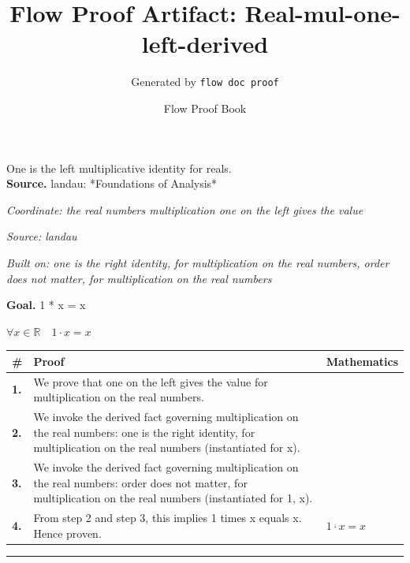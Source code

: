 \documentclass[11pt]{article}
\title{Flow Proof Artifact: Real-mul-one-left-derived}
\author{Generated by \texttt{flow doc proof}}
\date{Flow Proof Book}
\theoremstyle{definition}
\begin{document}
\maketitle
One is the left multiplicative identity for reals.\\[0.5em]
\textbf{Source.} landau: *Foundations of Analysis*\\[0.5em]
\bigskip
{}\par
\smallskip\noindent\textit{Coordinate: the real numbers \cdot multiplication \cdot one on the left gives the value}\par
\smallskip\noindent\textit{Source: landau}\par
\smallskip\noindent\textit{Built on: one is the right identity, for multiplication on the real numbers, order does not matter, for multiplication on the real numbers}\par
\medskip
\noindent\textbf{Goal.} 1 * x = x\par
\noindent$\displaystyle \forall x \in \mathbb{R}\quad 1 \cdot x = x$\par
\medskip
\noindent
\begin{tabular}{@{} >{\raggedright\arraybackslash}p{} >{\raggedright\arraybackslash}p{} >{\raggedleft\arraybackslash}p{} @{}}
\textbf{\#} & \textbf{Proof} & \textbf{Mathematics} \\
\midrule
\textbf{1.} & We prove that one on the left gives the value for multiplication on the real numbers. & \\[0.45em]
\textbf{2.} & We invoke the derived fact governing multiplication on the real numbers: one is the right identity, for multiplication on the real numbers (instantiated for x). & \\[0.45em]
\textbf{3.} & We invoke the derived fact governing multiplication on the real numbers: order does not matter, for multiplication on the real numbers (instantiated for 1, x). & \\[0.45em]
\textbf{4.} & From step 2 and step 3, this implies 1 times x equals x. Hence proven. & $\displaystyle 1 \cdot x = x$ \\[0.45em]
\bottomrule
\end{tabular}
\label{thm:Real-multiplication-one_on_the_left_gives_the_value}
\par\medskip\hrule
\end{document}
